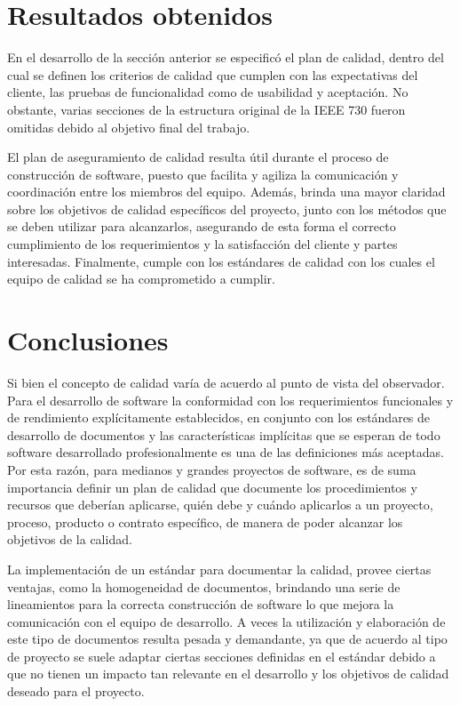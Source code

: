 \documentclass[a4paper,10pt]{article}
\begin{document}
	\section{Resultados obtenidos}
	En el desarrollo de la sección anterior se especificó el plan de calidad, dentro del cual se definen los criterios de calidad que cumplen con las expectativas del cliente, las pruebas de funcionalidad como de usabilidad y aceptación. No obstante, varias secciones de la estructura original de la IEEE 730 fueron omitidas debido al objetivo final del trabajo.

	El plan de aseguramiento de calidad resulta útil durante el proceso de construcción de software, puesto que facilita y agiliza la comunicación y coordinación entre los miembros del equipo. Además, brinda una mayor claridad sobre los objetivos de calidad específicos del proyecto, junto con los métodos que se deben utilizar para alcanzarlos, asegurando de esta forma el correcto cumplimiento de los requerimientos y la satisfacción del cliente y partes interesadas. Finalmente, cumple con los estándares de calidad con los cuales el equipo de calidad se ha comprometido a cumplir.
	
	\section{Conclusiones}
	Si bien el concepto de calidad varía de acuerdo al punto de vista del observador. Para el desarrollo de software la conformidad con los requerimientos funcionales y de rendimiento explícitamente establecidos, en conjunto con los estándares de desarrollo de documentos y las características implícitas que se esperan de todo software desarrollado profesionalmente es una de las definiciones más aceptadas. Por esta razón, para medianos y grandes proyectos de software, es de suma importancia definir un plan de calidad que documente los procedimientos y recursos que deberían aplicarse, quién debe y cuándo aplicarlos a un proyecto, proceso, producto o contrato específico, de manera de poder alcanzar los objetivos de la calidad.

	La implementación de un estándar para documentar la calidad, provee ciertas ventajas, como la homogeneidad de documentos, brindando una serie de lineamientos para la correcta construcción de software lo que mejora la comunicación con el equipo de desarrollo. A veces la utilización y elaboración de este tipo de documentos resulta pesada y demandante, ya que de acuerdo al tipo de proyecto se suele adaptar ciertas secciones definidas en el estándar debido a que no tienen un impacto tan relevante en el desarrollo y los objetivos de calidad deseado para el proyecto.
\end{document}
